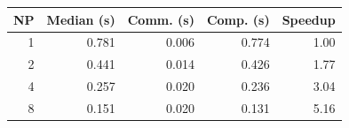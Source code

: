\begin{tabular}{rrrrr}
  \toprule
  NP & Median (s) & Comm. (s) & Comp. (s) & Speedup \\
  \midrule
  1 & 0.781 & 0.006 & 0.774 & 1.00 \\
  2 & 0.441 & 0.014 & 0.426 & 1.77 \\
  4 & 0.257 & 0.020 & 0.236 & 3.04 \\
  8 & 0.151 & 0.020 & 0.131 & 5.16 \\
  \bottomrule
\end{tabular}
